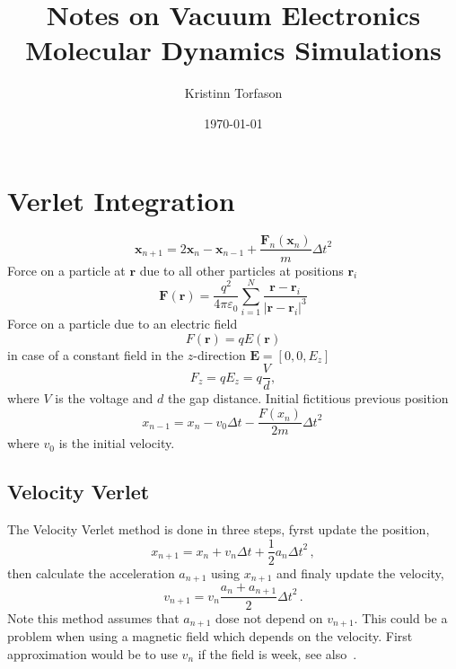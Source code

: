\documentclass[a4paper,10pt]{article}
\title{Notes on Vacuum Electronics Molecular Dynamics Simulations}
\author{Kristinn Torfason}
\date{\today}
\begin{document}
\maketitle\thispagestyle{empty}
\newpage

\section{Verlet Integration}
\begin{equation}
\mathbf{x}_{n+1} = 2\mathbf{x}_{n} - \mathbf{x}_{n-1} + \frac{\mathbf{F}_{n}(\mathbf{x}_{n})}{m} {\Delta t}^{2}
\end{equation}
Force on a particle at \(\mathbf{r}\) due to all other particles at positions \(\mathbf{r}_i\)
\begin{equation}
  \mathbf{F}(\mathbf{r}) = \frac{q^2}{4\pi\varepsilon_0} \sum_{i=1}^{N} \frac{\mathbf{r} - \mathbf{r}_i}{|\mathbf{r} - \mathbf{r}_i|^3}
\end{equation}
Force on a particle due to an electric field
\begin{equation}
  F(\mathbf{r}) = qE(\mathbf{r})
\end{equation}
in case of a constant field in the \(z\)-direction \(\mathbf{E} = \left[ 0, 0, E_z \right]\)
\begin{equation}
 F_z = qE_z = q \frac{V}{d},
\end{equation}
where \(V\) is the voltage and \(d\) the gap distance.
Initial fictitious previous position
\begin{equation}
 x_{n-1} = x_n - v_0{\Delta t} - \frac{F(x_n)}{2 m} {\Delta t}^2\,
\end{equation}
where \(v_0\) is the initial velocity.

\subsection{Velocity Verlet}
  The Velocity Verlet method is done in three steps, fyrst update the position,
  \begin{equation}
    x_{n+1} = x_n + v_n\Delta t + \frac{1}{2}a_n{\Delta t}^2\, ,
  \end{equation}
  then calculate the acceleration \(a_{n+1}\) using \(x_{n+1}\) and finaly
  update the velocity,
  \begin{equation}
    v_{n+1} = v_n \frac{a_n + a_{n+1}}{2}{\Delta t}^2\, .
  \end{equation}
  Note this method assumes that \(a_{n+1}\) dose not depend on \(v_{n+1}\).
  This could be a problem when using a magnetic field which depends on the
  velocity. First approximation would be to use \(v_n\) if the field is week,
  see also~\cite{SPREITER1999102}.
\end{document}
